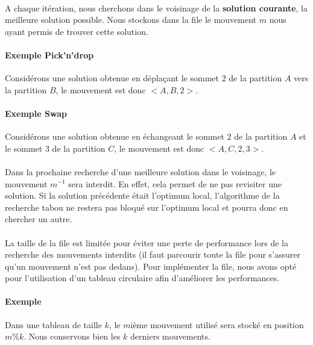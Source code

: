 \documentclass[12pt]{article}
\begin{document}
\paragraph{}A chaque itération, nous cherchons dans le voisinage de la \textbf{solution courante}, la meilleure solution possible.
Nous stockons dans la file le mouvement $m$ nous ayant permis de trouver cette solution.

\paragraph{Exemple Pick'n'drop} Considérons une solution obtenue en déplaçant le sommet $2$ de la partition $A$ vers la partition $B$, le mouvement est donc $<A,B,2>$.

\paragraph{Exemple Swap} Considérons une solution obtenue en échangeant le sommet $2$ de la partition $A$ et le sommet $3$ de la partition $C$, le mouvement est donc $<A,C,2,3>$.

\paragraph{}Dans la prochaine recherche d'une meilleure solution dans le voisinage, le mouvement $m^{-1}$ sera interdit.
En effet, cela permet de ne pas revisiter une solution.
Si la solution précédente était l'optimum local, l'algorithme de la recherche tabou ne restera pas bloqué sur l'optimum local et pourra donc en chercher un autre.

\paragraph{}La taille de la file est limitée pour éviter une perte de performance lors de la recherche des mouvements interdits (il faut parcourir toute la file pour s'assurer qu'un mouvement n'est pas dedans). Pour implémenter la file, nous avons opté pour l'utilisation d'un tableau circulaire afin d'améliorer les performances.

\paragraph{Exemple} Dans une tableau de taille $k$, le $m$ième mouvement utilisé sera stocké en position $m\%k$. Nous conservons bien les $k$ derniers mouvements.
\end{document}
